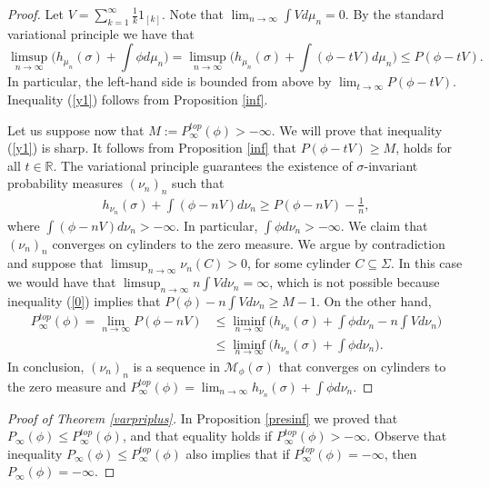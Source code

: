 \documentclass[letterpaper,11pt]{amsart}
\theoremstyle{plain}
\theoremstyle{plain}
\theoremstyle{definition}
\theoremstyle{remark}
\def\R{{\mathbb R}}
\def\M{{\mathcal M}}
\begin{document}
\begin{proof} Let  $V=\sum_{k=1}^\infty \frac{1}{k}1_{[k]}$. Note that $\lim_{n\to\infty}\int Vd\mu_n=0$. By the standard variational principle we have that 
$$\limsup_{n\to\infty}\bigg(h_{\mu_n}(\sigma)+\int\phi d\mu_n\bigg)=\limsup_{n\to\infty}\bigg(h_{\mu_n}(\sigma)+\int (\phi -tV)d\mu_n\bigg)\le P(\phi -tV).$$
In particular, the left-hand side is bounded from above by $\lim_{t\to\infty}P(\phi -tV)$. Inequality (\ref{y1}) follows from Proposition \ref{inf}.

Let us suppose now that $M:=P^{top}_\infty(\phi )>-\infty$. We will prove that inequality (\ref{y1}) is sharp. It follows from Proposition \ref{inf} that $P(\phi -tV)\ge M$, holds for all $t\in\R$. The variational principle guarantees the existence of $\sigma$-invariant probability measures $(\nu_n)_n$ such that 
\begin{align}\label{0} h_{\nu_n}(\sigma)+\int (\phi-nV) d\nu_n\ge P(\phi -nV)-\frac{1}{n},\end{align}
where $\int (\phi -nV)d\nu_n>-\infty$. In particular, $\int \phi d\nu_n>-\infty$. We claim that $(\nu_n)_n$ converges on cylinders to the zero measure. We argue by contradiction and suppose that  $\limsup_{n\to\infty}\nu_n(C)>0$, for some cylinder $C\subseteq \Sigma$. In this case we would have that $\limsup_{n\to\infty}n\int Vd\nu_n=\infty$, which is not possible because inequality (\ref{0}) implies that $P(\phi)-n\int Vd\nu_ n\ge M-1$. On the other hand, 
\begin{align*} P^{top}_\infty(\phi )=\lim_{n\to\infty}P(\phi -nV) &\le \liminf_{n\to\infty}\big(h_{\nu_n}(\sigma)+\int \phi d\nu_n-n\int Vd\nu_n\big)\\
&\le \liminf_{n\to\infty} \big(h_{\nu_n}(\sigma)+\int \phi d\nu_n\big).\end{align*}
In conclusion, $(\nu_n)_n$ is a sequence in $\M_\phi(\sigma)$ that converges on cylinders to the zero measure and $P^{top}_\infty(\phi )=\lim_{n\to\infty} h_{\nu_n}(\sigma)+\int \phi d\nu_n.$
\end{proof}

\begin{proof}[Proof of Theorem \ref{varpriplus}] In Proposition \ref{presinf} we proved that $P_\infty(\phi)\le P^{top}_\infty(\phi)$, and that equality holds if $P^{top}_\infty(\phi)>-\infty$.  Observe that inequality $P_\infty(\phi)\le P^{top}_\infty(\phi)$ also implies that if $P^{top}_\infty(\phi)=-\infty$, then $P_\infty(\phi)=-\infty$. 
\end{proof}
\end{document}
